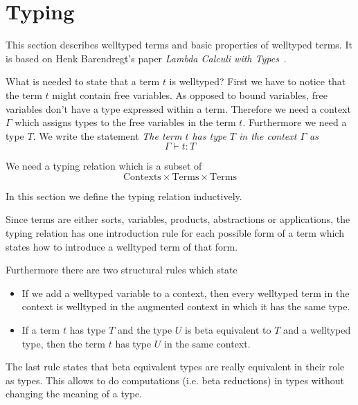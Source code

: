\section{Typing}
\label{sec:Typing}


This section describes welltyped terms and basic properties of welltyped terms.
It is based on Henk Barendregt's paper \emph{Lambda Calculi with
Types}~\cite{barendregt1993}.

What is needed to state that a term $t$ is welltyped? First we have to notice
that the term $t$ might contain free variables. As opposed to bound variables,
free variables don't have a type expressed within a term. Therefore we need a
context $\Gamma$ which assigns types to the free variables in the term $t$.
Furthermore we need a type $T$. We write the statement \emph{The term $t$ has
type $T$ in the context $\Gamma$ as}
$$
    \Gamma \vdash t : T
$$

We need a typing relation which is a subset of
$$
    \text{Contexts} \times \text{Terms} \times \text{Terms}
$$

In this section we define the typing relation inductively.

Since terms are either sorts, variables, products, abstractions or applications,
the typing relation has one introduction rule for each possible form of a term
which states how to introduce a welltyped term of that form.

Furthermore there are two structural rules which state
\begin{itemize}
    \item If we add a welltyped variable to a context, then every welltyped term
        in the context is welltyped in the augmented context in which it has the
        same type.

    \item If a term $t$ has type $T$ and the type $U$ is beta equivalent to $T$
        and a welltyped type, then the term $t$ has type $U$ in the same
        context.
\end{itemize}

The last rule states that beta equivalent types are really equivalent in their
role as types. This allows to do computations (i.e. beta reductions) in types
without changing the meaning of a type.


